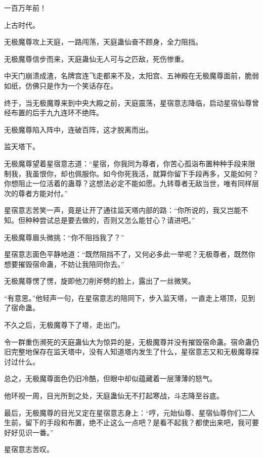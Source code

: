 
\begin{this_body}

一百万年前！

上古时代。

无极魔尊攻上天庭，一路闯荡，天庭蛊仙奋不顾身，全力阻挡。

无极魔尊信步而来，天庭蛊仙无人可与之匹敌，死伤惨重。

中天门崩溃成渣，名牌宫连飞走都来不及，太阳宫、五神殿在无极魔尊面前，脆弱如纸，仿佛只是作为一个笑话存在。

终于，当无极魔尊来到中央大殿之前，天庭震荡，星宿意志降临，启动星宿仙尊曾经布置的后手九九连环不绝阵。

无极魔尊陷入阵中，连破百阵，这才脱离而出。

监天塔下。

无极魔尊望着星宿意志道：“星宿，你我同为尊者，你苦心孤诣布置种种手段来限制我，我虽恨你，却也佩服你。如今你死我活，就算你留下手段再多，又能如何？你想阻止一位活着的蛊尊？这想法必定不能如愿。九转尊者无敌当世，唯有同样层次的尊者方能对付。”

星宿意志苦笑一声，竟是让开了通往监天塔内部的路：“你所说的，我又岂能不知。但种种尝试总是要去做的，否则又怎么能甘心？请进吧。”

无极魔尊眉头微挑：“你不阻挡我了？”

星宿意志面色平静地道：“既然阻挡不了，又何必多此一举呢？无极尊者，既然你想要摧毁宿命蛊，不妨让我陪同你去。”

无极魔尊愣了愣，旋即他刀削斧劈的脸上，露出了一丝微笑。

“有意思。”他轻声一句，在星宿意志的陪同下，步入监天塔，一直走上塔顶，见到了宿命蛊。

不久之后，无极魔尊下了塔，走出门。

令一群重伤濒死的天庭蛊仙大为惊异的是，无极魔尊并没有摧毁宿命蛊。宿命蛊仍旧完整地保存在监天塔中，没有人知道塔内发生了什么，星宿意志又和无极魔尊探讨过什么。

总之，无极魔尊面色仍旧冷酷，但眼中却似蕴藏着一层薄薄的怒气。

他环视一周，目光所到之处，天庭蛊仙无不打起寒战，斗志降至谷底。

最后，无极魔尊的目光又定在星宿意志身上：“哼，元始仙尊、星宿仙尊你们二人生前，留下的手段和布置，绝不止这么一点吧？是看不起我？都使出来吧，我可要好好见识一番。”

星宿意志苦叹。


\end{this_body}
